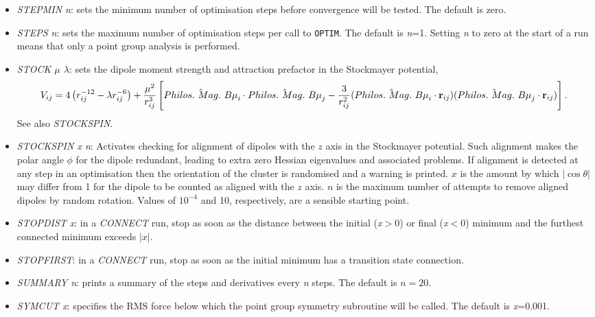 \documentclass[12pt,a4paper,dvips]{article}
\begin{document}
\begin{itemize}
\item {\it STEPMIN n\/}: sets the minimum number of optimisation steps before convergence
will be tested. The default is zero.

\item {\it STEPS n\/}: sets the maximum number of optimisation steps per call
to {\tt OPTIM}. The default is {\it n\/}=1. Setting {\it n\/} to zero at the start of a run
means that only a point group analysis is performed.

\item {\it STOCK $\mu$ $\lambda$}: sets the dipole moment strength and attraction prefactor
in the Stockmayer potential,
\begin{displaymath}
V_{ij} = 4\left(r_{ij}^{-12}-\lambda r_{ij}^{-6}\right) + \frac{\mu^2}{r_{ij}^3}
\left[\hat{\pmb\mu}_i\cdot\hat{\pmb\mu}_j-\frac{3}{r_{ij}^2}
(\hat{\pmb\mu}_i\cdot{\bf r}_{ij})(\hat{\pmb\mu}_j\cdot{\bf r}_{ij})\right].
\end{displaymath}
See also {\it STOCKSPIN}.

\item {\it STOCKSPIN x n}: Activates checking for alignment of dipoles with the $z$ axis in
the Stockmayer potential.  Such alignment makes the polar angle $\phi$ for the dipole
redundant, leading to extra zero Hessian eigenvalues and associated problems.  If alignment
is detected at any step in an optimisation then the orientation of the cluster is randomised
and a warning is printed.
$x$ is the amount by which $|\cos\theta|$ may differ from 1 for the dipole to be counted as
aligned with the $z$ axis.  $n$ is the maximum number of attempts to remove aligned dipoles
by random rotation.  Values of $10^{-4}$ and 10, respectively, are a sensible starting point.

\item {\it STOPDIST x\/}: in a {\it CONNECT\/} run, stop as soon as the distance between
the initial ({\it x}$>0$) or final ({\it x}$<0$) minimum and the furthest connected minimum
exceeds $|x|$.

\item {\it STOPFIRST\/}: in a {\it CONNECT\/} run, stop as soon as the initial minimum has a transition state
connection.

\item {\it SUMMARY n\/}: prints a summary of the steps and derivatives
every {\it n\/} steps. The default is $n=20$.

\item {\it SYMCUT x\/}: specifies the RMS force below which the point
group symmetry subroutine will be called. The default is {\it x\/}=0.001.


\end{itemize}
\end{document}
